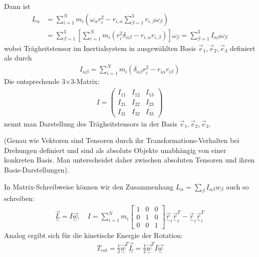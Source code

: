 \documentclass[10pt, letterpaper]{article}
\begin{document}
Dann ist
\[
\begin{aligned}
L_\alpha &= \sum_{i=1}^N m_i \left( \omega_\alpha r_i^2 - r_{i,\alpha} \sum_{\beta=1}^3 r_{i,\beta} \omega_\beta \right) \\
&= \sum_{\beta=1}^3 \left[ \sum_{i=1}^N m_i \left( r_i^2 \delta_{\alpha\beta} - r_{i,\alpha} r_{i,\beta} \right) \right] \omega_\beta
= \sum_{\beta=1}^3 I_{\alpha\beta} \omega_\beta
\end{aligned}
\]
wobei Trägheitstensor im Inertialsystem in ausgewählten Basis $\vec{e}_1, \vec{e}_2, \vec{e}_3$ definiert als durch
$$
\begin{aligned}
I_{\alpha\beta} = \sum_{i=1}^N m_i \left(\delta_{\alpha\beta} r_i^2 - r_{i\alpha} r_{i\beta}\right)
\end{aligned}
$$
Die entsprechende 3$\times$3-Matrix:
$$
\begin{aligned}
I = \begin{pmatrix}
I_{11} & I_{12} & I_{13} \\
I_{21} & I_{22} & I_{23} \\
I_{31} & I_{32} & I_{33}
\end{pmatrix}
\end{aligned}
$$
nennt man Darstellung des Trägheitstensors in der Basis $\vec{e}_1,\vec{e}_2,\vec{e}_3$.

(Genau wie Vektoren sind Tensoren durch ihr Transformations-Verhalten bei Drehungen definiert und sind als absolute Objekte unabhängig von einer konkreten Basis. Man unterscheidet daher zwischen absoluten Tensoren und ihren Basis-Darstellungen).

In Matrix-Schreibweise können wir den Zusammenhang $L_\alpha = \sum_\beta I_{\alpha\beta}w_\beta$ auch so schreiben:
$$
\begin{aligned}
\vec{\underset{\sim}{L}} = I \vec{\underset{\sim}{w}}, \quad I = \sum_{i=1}^N m_i \begin{bmatrix}
1 & 0 & 0 \\
0 & 1 & 0 \\
0 & 0 & 1
\end{bmatrix} \vec{\underset{\sim}{r}}_i \vec{\underset{\sim}{r}}_i^T - \vec{\underset{\sim}{r}}_i \vec{\underset{\sim}{r}}_i^T
\end{aligned}
$$
Analog ergibt sich für die kinetische Energie der Rotation:
$$
\begin{aligned}
T_{rot} = \frac{1}{2} \vec{\underset{\sim}{w}}^T \vec{\underset{\sim}{L}} = \frac{1}{2} \vec{\underset{\sim}{w}}^T I \vec{\underset{\sim}{w}}
\end{aligned}
$$
\end{document}
